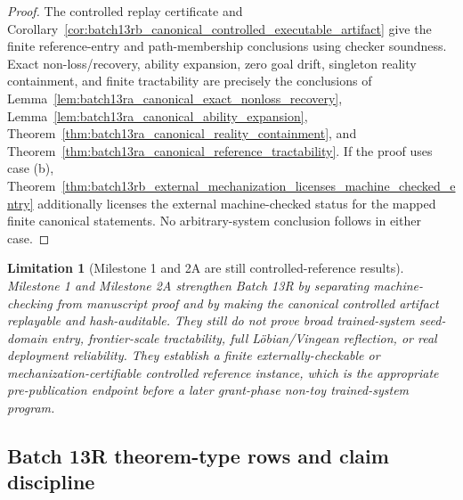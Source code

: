 \documentclass[11pt]{article}
\newtheorem{limitation}[theorem]{Limitation}
\newcommand{\1}{\mathbf{1}}
\begin{document}
\begin{proof}
The controlled replay certificate and Corollary~\ref{cor:batch13rb_canonical_controlled_executable_artifact} give the finite reference-entry and path-membership conclusions using checker soundness.  Exact non-loss/recovery, ability expansion, zero goal drift, singleton reality containment, and finite tractability are precisely the conclusions of Lemma~\ref{lem:batch13ra_canonical_exact_nonloss_recovery}, Lemma~\ref{lem:batch13ra_canonical_ability_expansion}, Theorem~\ref{thm:batch13ra_canonical_reality_containment}, and Theorem~\ref{thm:batch13ra_canonical_reference_tractability}.  If the proof uses case (b), Theorem~\ref{thm:batch13rb_external_mechanization_licenses_machine_checked_entry} additionally licenses the external machine-checked status for the mapped finite canonical statements.  No arbitrary-system conclusion follows in either case.
\end{proof}

\begin{limitation}[Milestone 1 and 2A are still controlled-reference results]
\label{lim:batch13rb_milestone_scope}
Milestone 1 and Milestone 2A strengthen Batch 13R by separating machine-checking from manuscript proof and by making the canonical controlled artifact replayable and hash-auditable.  They still do not prove broad trained-system seed-domain entry, frontier-scale tractability, full L\"obian/Vingean reflection, or real deployment reliability.  They establish a finite externally-checkable or mechanization-certifiable controlled reference instance, which is the appropriate pre-publication endpoint before a later grant-phase non-toy trained-system program.
\end{limitation}



\subsection{Batch 13R theorem-type rows and claim discipline}
\end{document}
